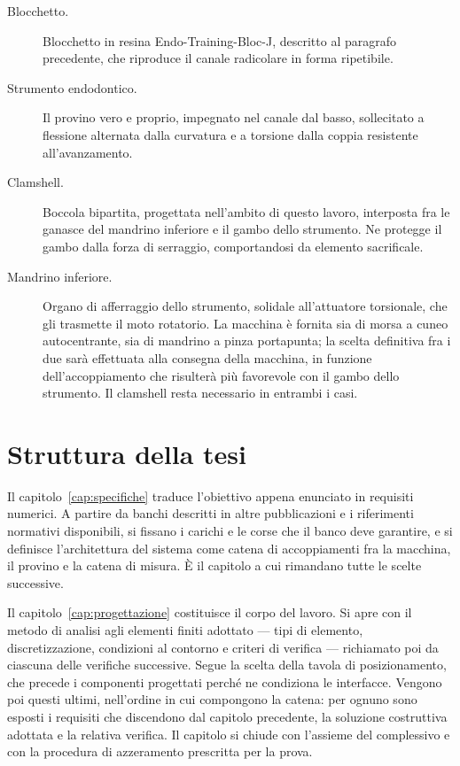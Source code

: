 \begin{description}
  \item[Blocchetto.] Blocchetto in resina Endo-Training-Bloc-J, descritto al
    paragrafo precedente, che riproduce il canale radicolare in forma
    ripetibile.

  \item[Strumento endodontico.] Il provino vero e proprio, impegnato nel canale
    dal basso, sollecitato a flessione alternata dalla curvatura e a torsione
    dalla coppia resistente all'avanzamento.

  \item[Clamshell.] Boccola bipartita, progettata nell'ambito di questo lavoro,
    interposta fra le ganasce del mandrino inferiore e il gambo dello
    strumento. Ne protegge il gambo dalla forza di serraggio, comportandosi da
    elemento sacrificale.

  \item[Mandrino inferiore.] Organo di afferraggio dello strumento, solidale
    all'attuatore torsionale, che gli trasmette il moto rotatorio. La macchina
    è fornita sia di morsa a cuneo autocentrante, sia di mandrino a pinza
    portapunta; la scelta definitiva fra i due sarà effettuata alla consegna
    della macchina, in funzione dell'accoppiamento che risulterà più favorevole
    con il gambo dello strumento. Il clamshell resta necessario in entrambi i
    casi.

\end{description}

\section{Struttura della tesi}

Il capitolo~\ref{cap:specifiche} traduce l'obiettivo appena enunciato in
requisiti numerici. A partire da banchi descritti in altre pubblicazioni e i
riferimenti normativi disponibili, si fissano i carichi e le corse che il banco
deve garantire, e si definisce l'architettura del sistema come catena di
accoppiamenti fra la macchina, il provino e la catena di misura. È il capitolo a
cui rimandano tutte le scelte successive.

Il capitolo~\ref{cap:progettazione} costituisce il corpo del lavoro. Si apre con
il metodo di analisi agli elementi finiti adottato --- tipi di elemento,
discretizzazione, condizioni al contorno e criteri di verifica --- richiamato
poi da ciascuna delle verifiche successive. Segue la scelta della tavola di
posizionamento, che precede i componenti progettati perché ne condiziona le
interfacce. Vengono poi questi ultimi, nell'ordine in cui compongono la catena:
per ognuno sono esposti i requisiti che discendono dal capitolo precedente, la
soluzione costruttiva adottata e la relativa verifica. Il capitolo si chiude con
l'assieme del complessivo e con la procedura di azzeramento prescritta per la
prova.

